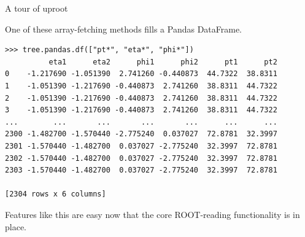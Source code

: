 \documentclass[aspectratio=169]{beamer}
\begin{document}






\begin{frame}[fragile]{A tour of uproot}
\vspace{0.5 cm}
\small

{\normalsize One of these array-fetching methods fills a Pandas DataFrame.}

\begin{verbatim}
>>> tree.pandas.df(["pt*", "eta*", "phi*"])
          eta1      eta2      phi1      phi2      pt1      pt2
0    -1.217690 -1.051390  2.741260 -0.440873  44.7322  38.8311
1    -1.051390 -1.217690 -0.440873  2.741260  38.8311  44.7322
2    -1.051390 -1.217690 -0.440873  2.741260  38.8311  44.7322
3    -1.051390 -1.217690 -0.440873  2.741260  38.8311  44.7322
...        ...       ...       ...       ...      ...      ...
2300 -1.482700 -1.570440 -2.775240  0.037027  72.8781  32.3997
2301 -1.570440 -1.482700  0.037027 -2.775240  32.3997  72.8781
2302 -1.570440 -1.482700  0.037027 -2.775240  32.3997  72.8781
2303 -1.570440 -1.482700  0.037027 -2.775240  32.3997  72.8781

[2304 rows x 6 columns]
\end{verbatim}

\vspace{0.2 cm}
{\normalsize Features like this are easy now that the core ROOT-reading functionality is in place.}
\end{frame}
\end{document}

